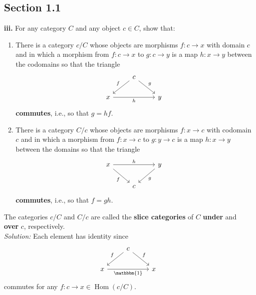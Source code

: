 \documentclass[a4paper]{article}
\theoremstyle{plain}%
\theoremstyle{definition}
\theoremstyle{remark}
\DeclareMathOperator{\Hom}{Hom}
\begin{document}
\subsection*{Section 1.1}

\textbf{iii.} For any category $C$ and any object $c \in C$, show that:\\
\begin{enumerate}
    \item There is a category $c /C$ whose objects are morphisms $f  \colon
        c \to x$ with domain $c$ and in which a morphism from
         $f  \colon c \to x$ to $g  \colon c \to y$ is a map
         $h  \colon x \to y$ between the codomains so that the triangle
         \begin{equation*}
         \begin{tikzcd}
             & c \ar[dl, "f"'] \ar[dr, "g"] &\\
             x \ar[rr, "h"'] & & y
         \end{tikzcd}
         \end{equation*}
         \textbf{commutes}, i.e., so that $g = hf$.
     \item There is a category $C /c$ whose objects are morphisms $f  \colon
         x \to c$ with codomain $c$ and in which a morphism from
         $f  \colon x \to c$ to $g  \colon y \to c$ is a map 
         $h  \colon x \to y$ between the domains so that the triangle
         \begin{equation*}
         \begin{tikzcd}
             x \ar[dr, "f"'] \ar[rr, "h"] & & y \ar[dl, "g"]\\
                                         & c &
         \end{tikzcd}
         \end{equation*}
         \textbf{commutes}, i.e., so that $f = gh$.
\end{enumerate}
The categories $c /C$ and $C / c$ are called the \textbf{slice categories} of
$C$ \textbf{under} and  \textbf{over} $c$, respectively.\\
\linebreak
\textit{Solution:} Each element has identity since
\begin{equation*}
\begin{tikzcd}
    & c \ar[dl, "f"'] \ar[dr, "f"] &\\
    x \ar[rr, "\mathbbm{1}"'] & & x
\end{tikzcd}
\end{equation*}
commutes for any $f  \colon c \to x \in \Hom \left( c /C \right) $.\\
\end{document}
